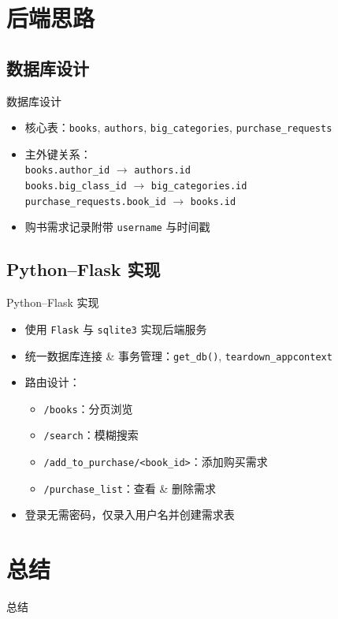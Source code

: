\documentclass{ctexbeamer}
\begin{document}
\section{后端思路}

\subsection{数据库设计}
\begin{frame}{数据库设计}
  \begin{itemize}
    \item 核心表：\texttt{books}, \texttt{authors}, \texttt{big_categories}, \texttt{purchase_requests}
    \item 主外键关系：\\
      \texttt{books.author\_id} \ensuremath{\to} \texttt{authors.id}\\
      \texttt{books.big\_class\_id} \ensuremath{\to} \texttt{big_categories.id}\\
      \texttt{purchase\_requests.book\_id} \ensuremath{\to} \texttt{books.id}
    \item 购书需求记录附带 \texttt{username} 与时间戳
  \end{itemize}
\end{frame}

\subsection{Python–Flask 实现}
\begin{frame}{Python–Flask 实现}
  \begin{itemize}
    \item 使用 \texttt{Flask} 与 \texttt{sqlite3} 实现后端服务
    \item 统一数据库连接 & 事务管理：\texttt{get\_db()}, \texttt{teardown\_appcontext}
    \item 路由设计：
      \begin{itemize}
        \item \texttt{/books}：分页浏览
        \item \texttt{/search}：模糊搜索
        \item \texttt{/add\_to\_purchase/<book\_id>}：添加购买需求
        \item \texttt{/purchase\_list}：查看 \& 删除需求
      \end{itemize}
    \item 登录无需密码，仅录入用户名并创建需求表
  \end{itemize}
\end{frame}


\section{总结}

\begin{frame}{总结}

\end{frame}
\end{document}
